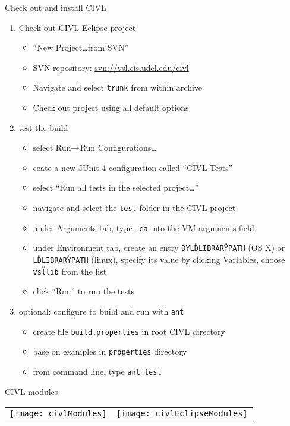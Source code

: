 \documentclass[t]{beamer}
\begin{document}
\begin{frame}{Check out and install CIVL}
  \begin{enumerate}
  \item Check out CIVL Eclipse project 
    \begin{itemize}
    \item ``New Project\ldots from SVN''
    \item SVN repository: \url{svn://vsl.cis.udel.edu/civl}
    \item Navigate and select \texttt{trunk} from within archive
    \item Check out project using all default options
    \end{itemize}
  \item test the build
    \begin{itemize}
    \item select Run$\rightarrow$Run Configurations\ldots
    \item ceate a new JUnit 4 configuration called ``CIVL Tests''
    \item select ``Run all tests in the selected project\ldots''
    \item navigate and select the \texttt{test} folder in the CIVL project
    \item under Arguments tab, type \texttt{-ea} into the VM arguments field
    \item under Environment tab, create an entry
      \texttt{DYLD{\U}LIBRARY{\U}PATH} (OS X) or
      \texttt{LD{\U}LIBRARY{\U}PATH} (linux), specify its value by
      clicking Variables, choose \texttt{vsl{\U}lib} from the list
    \item click ``Run'' to run the tests
    \end{itemize}
  \item \alert{optional:} configure to build and run with \texttt{ant}
    \begin{itemize}
    \item create file \texttt{build.properties} in root CIVL directory
    \item base on examples in \texttt{properties} directory
    \item from command line, type \texttt{ant test}
    \end{itemize}
  \end{enumerate}
\end{frame}

\begin{frame}{CIVL modules}
  \begin{tabular}{@{}ll@{}}
    \texttt{[image: civlModules]}
    &
    \texttt{[image: civlEclipseModules]}
  \end{tabular}
\end{frame}
\end{document}
